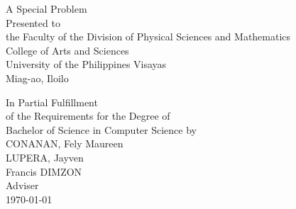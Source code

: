 \begin{titlepage}
\centering


\vspace{1.75cm}
A Special Problem\\
Presented to\\
the Faculty of the Division of Physical Sciences and Mathematics\\
College of Arts and Sciences\\
University of the Philippines Visayas\\
Miag-ao, Iloilo

\vspace{1.75cm}
In Partial Fulfillment\\
of the Requirements for the Degree of\\
Bachelor of Science in Computer Science
\vspace{1.75cm}
by\\

\vspace{1cm}
CONANAN, Fely Maureen  \\
LUPERA, Jayven  \\

\vspace{1.75cm}
Francis DIMZON \\
Adviser\\

\vspace{1.75cm}
\today
\end{titlepage}
